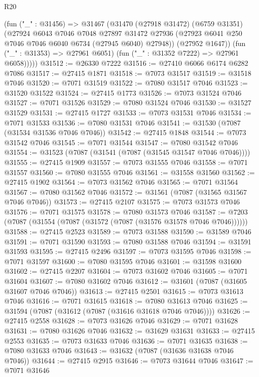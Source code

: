 \begin{lexlean}{R20}
\begin{coremodule}
{          (fun ("_" : @31456) =>
          @31467
            (@31470
              (@27918 @31472)
              (@6759 @31351)
              (@27924
                @6043
                @7046
                @7048
                @27897
                @31472
                @27936
                (@27923 @6041 @250 @7046 @7046 @6040 @6734 (@27945 @6040) @27948))
              (@27952 @1647))
            (fun ("_" : @31353) => @27961 @6051)
            (fun ("_" : @31352 @7222) => @27961 @6058)))))
@31512 := @26330 @7222
@31516 := @27410 @6066 @6174 @6282 @7086
@31517 := @27415 @1871
@31518 := @7073 @31517
@31519 := @31518 @7046
@31520 := @7071 @31519
@31522 := @7080 @31517 @7046
@31523 := @31520 @31522
@31524 := @27415 @1773
@31526 := @7073 @31524 @7046
@31527 := @7071 @31526
@31529 := @7080 @31524 @7046
@31530 := @31527 @31529
@31531 := @27415 @1727
@31533 := @7073 @31531 @7046
@31534 := @7071 @31533
@31536 := @7080 @31531 @7046
@31541 := @31530 (@7087 (@31534 @31536 @7046 @7046))
@31542 := @27415 @1848
@31544 := @7073 @31542 @7046
@31545 := @7071 @31544
@31547 := @7080 @31542 @7046
@31554 := @31523 (@7087 (@31541 (@7087 (@31545 @31547 @7046 @7046))))
@31555 := @27415 @1909
@31557 := @7073 @31555 @7046
@31558 := @7071 @31557
@31560 := @7080 @31555 @7046
@31561 := @31558 @31560
@31562 := @27415 @1902
@31564 := @7073 @31562 @7046
@31565 := @7071 @31564
@31567 := @7080 @31562 @7046
@31572 := @31561 (@7087 (@31565 @31567 @7046 @7046))
@31573 := @27415 @2107
@31575 := @7073 @31573 @7046
@31576 := @7071 @31575
@31578 := @7080 @31573 @7046
@31587 := @7203 (@7087 (@31554 (@7087 (@31572 (@7087 (@31576 @31578 @7046 @7046))))))
@31588 := @27415 @2523
@31589 := @7073 @31588
@31590 := @31589 @7046
@31591 := @7071 @31590
@31593 := @7080 @31588 @7046
@31594 := @31591 @31593
@31595 := @27415 @2496
@31597 := @7073 @31595 @7046
@31598 := @7071 @31597
@31600 := @7080 @31595 @7046
@31601 := @31598 @31600
@31602 := @27415 @2207
@31604 := @7073 @31602 @7046
@31605 := @7071 @31604
@31607 := @7080 @31602 @7046
@31612 := @31601 (@7087 (@31605 @31607 @7046 @7046))
@31613 := @27415 @2501
@31615 := @7073 @31613 @7046
@31616 := @7071 @31615
@31618 := @7080 @31613 @7046
@31625 := @31594 (@7087 (@31612 (@7087 (@31616 @31618 @7046 @7046))))
@31626 := @27415 @2558
@31628 := @7073 @31626 @7046
@31629 := @7071 @31628
@31631 := @7080 @31626 @7046
@31632 := @31629 @31631
@31633 := @27415 @2553
@31635 := @7073 @31633 @7046
@31636 := @7071 @31635
@31638 := @7080 @31633 @7046
@31643 := @31632 (@7087 (@31636 @31638 @7046 @7046))
@31644 := @27415 @2915
@31646 := @7073 @31644 @7046
@31647 := @7071 @31646
}
\end{coremodule}
\end{lexlean}
